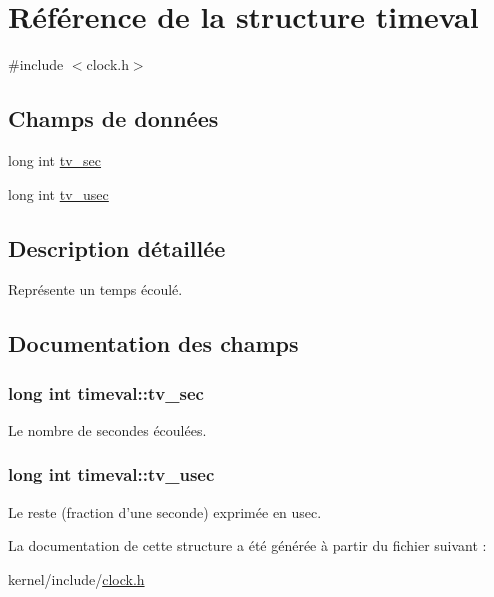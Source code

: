 \hypertarget{structtimeval}{\section{\-Référence de la structure timeval}
\label{structtimeval}
}


{\ttfamily \#include $<$clock.\-h$>$}

\subsection*{\-Champs de données}
\begin{DoxyCompactItemize}
\item 
long int \hyperlink{structtimeval_ab6fac84a084d017bb157f4681dafe8a3}{tv\-\_\-sec}
\item 
long int \hyperlink{structtimeval_a6f90a236deb00a89fe3dd8023d525d9c}{tv\-\_\-usec}
\end{DoxyCompactItemize}


\subsection{\-Description détaillée}
\-Représente un temps écoulé. 

\subsection{\-Documentation des champs}
\hypertarget{structtimeval_ab6fac84a084d017bb157f4681dafe8a3}{
\subsubsection[{tv\-\_\-sec}]{\setlength{\rightskip}{0pt plus 5cm}long int {\bf timeval\-::tv\-\_\-sec}}}\label{structtimeval_ab6fac84a084d017bb157f4681dafe8a3}
\-Le nombre de secondes écoulées. \hypertarget{structtimeval_a6f90a236deb00a89fe3dd8023d525d9c}{
\subsubsection[{tv\-\_\-usec}]{\setlength{\rightskip}{0pt plus 5cm}long int {\bf timeval\-::tv\-\_\-usec}}}\label{structtimeval_a6f90a236deb00a89fe3dd8023d525d9c}
\-Le reste (fraction d'une seconde) exprimée en usec. 

\-La documentation de cette structure a été générée à partir du fichier suivant \-:\begin{DoxyCompactItemize}
\item 
kernel/include/\hyperlink{clock_8h}{clock.\-h}\end{DoxyCompactItemize}
